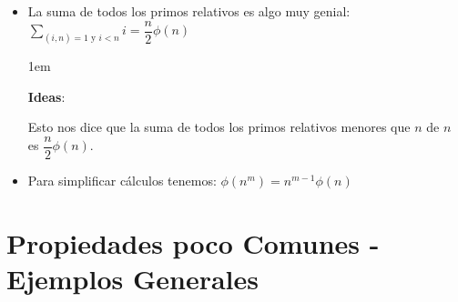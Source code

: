 \documentclass[12pt, fleqn]{report}                             %
\newenvironment{SmallIndentation}[1][0.75em]                    %
    {\begin{adjustwidth}{#1}{}\begin{footnotesize}}                 %
    {\end{footnotesize}\end{adjustwidth}}                           %
\begin{document}
\begin{itemize}
                \item La suma de todos los primos relativos es algo muy genial:\\
                    $\sum\limits_{(i, n) = 1 \text{ y } i < n} i = \dfrac{n}{2} \phi(n)$
                    
                    \begin{SmallIndentation}[1em]
                        \textbf{Ideas}:

                        Esto nos dice que la suma de todos los primos relativos menores que
                        $n$ de $n$ es $\dfrac{n}{2} \phi(n)$.

                    \end{SmallIndentation}

                \item Para simplificar cálculos tenemos: $\phi(n^m) = n^{m-1} \phi(n)$

                \clearpage

                

            \end{itemize}



    \clearpage
    \section{Propiedades poco Comunes - Ejemplos Generales}
\end{document}
